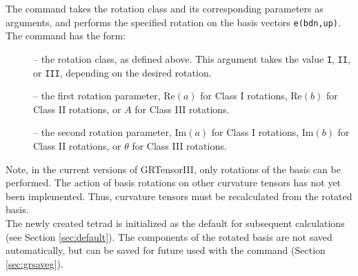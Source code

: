 \documentclass{article}
\begin{document}
The  command takes the rotation class and its corresponding
parameters as arguments, and performs the specified rotation on the basis
vectors \texttt{e(bdn,up)}. The command has the form:\\
%
\begin{cmdspec}
  \label{spec:nprotate}

  \begin{description} 
    \item[] -- the rotation class, as defined above. This
      argument takes the value \texttt{I}, \texttt{II}, or \texttt{III},
      depending on the desired rotation.

    \item[] -- the first rotation parameter,
      $\text{Re}(a)$ for Class I rotations, $\text{Re}(b)$ for Class
      II rotations, or $A$ for Class III rotations.

    \item[] -- the second rotation parameter,
      $\text{Im}(a)$ for Class I rotations, $\text{Im}(b)$ for Class
      II rotations, or $\theta$ for Class III rotations.
  \end{description}

\end{cmdspec}

Note, in the current versions of GRTensorIII, only rotations of the basis
can be performed. The action of basis rotations on other curvature tensors
has not yet been implemented. Thus, curvature tensors must be recalculated
from the rotated basis.\\

The newly created tetrad is initialized as the default for subsequent
calculations (see Section \ref{sec:default}).
The components of the rotated basis are not saved automatically, but can be
saved for future used with the  command (Section 
\ref{sec:grsaveg}).
%
\end{document}

